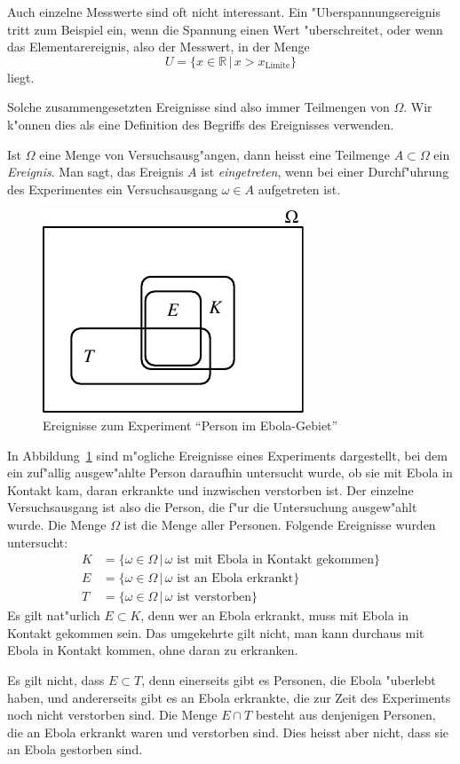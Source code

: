 Auch einzelne Messwerte sind oft nicht interessant.
Ein "Uberspannungsereignis tritt zum Beispiel ein, wenn die Spannung
einen Wert "uberschreitet, oder wenn das Elementarereignis, also der Messwert,
in der Menge
\[
U=
\{x\in\mathbb R\,|\, x > x_{\text{Limite}}\}
\]
liegt.

Solche zusammengesetzten Ereignisse sind also immer Teilmengen von $\Omega$.
Wir k"onnen dies als eine Definition des Begriffs des Ereignisses
verwenden.

\begin{definition}
Ist $\Omega$ eine Menge von Versuchsausg"angen, dann heisst eine Teilmenge
$A\subset\Omega$ ein {\em Ereignis}.
Man sagt, das Ereignis $A$ ist {\em eingetreten}, wenn bei einer Durchf"uhrung des
Experimentes ein Versuchsausgang $\omega\in A$ aufgetreten ist.
\end{definition}

\begin{beispiel}
\begin{figure}
\centering
\includegraphics{images/ebola-1.pdf}
\caption{Ereignisse zum Experiment ``Person im Ebola-Gebiet''
\label{image-ebola}}
\end{figure}

In Abbildung~\ref{image-ebola} sind m"ogliche Ereignisse eines Experiments
dargestellt, bei dem ein zuf"allig ausgew"ahlte Person daraufhin untersucht
wurde, ob sie mit Ebola in Kontakt kam, daran erkrankte und inzwischen
verstorben ist.
Der einzelne Versuchsausgang ist also die Person, die f"ur die
Untersuchung ausgew"ahlt wurde.
Die Menge $\Omega$ ist die Menge aller Personen.
Folgende Ereignisse wurden untersucht:
\begin{align*}
K&=\{\omega\in\Omega\,|\,\text{$\omega$ ist mit Ebola in Kontakt gekommen}\}
\\
E&=\{\omega\in\Omega\,|\,\text{$\omega$ ist an Ebola erkrankt}\}
\\
T&=\{\omega\in\Omega\,|\,\text{$\omega$ ist verstorben}\}
\end{align*}
Es gilt nat"urlich $E\subset K$, denn wer an Ebola erkrankt, muss mit
Ebola in Kontakt gekommen sein.
Das umgekehrte gilt nicht, man kann durchaus mit Ebola in Kontakt
kommen, ohne daran zu erkranken.

Es gilt nicht, dass $E\subset T$, denn einerseits gibt es Personen, die
Ebola "uberlebt haben, und andererseits gibt es an Ebola erkrankte,
die zur Zeit des Experiments noch nicht verstorben sind.
Die Menge $E\cap T$ besteht aus denjenigen Personen, die an Ebola
erkrankt waren und verstorben sind.
Dies heisst aber nicht, dass sie an Ebola gestorben sind.
\end{beispiel}

